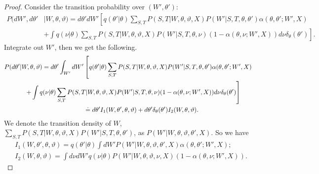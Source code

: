 \begin{proof}
Consider the transition probability over $(W',\theta')$:
\begin{align*}
  P(dW', d\theta'&| W, \theta, \vartheta)
=d\theta' dW' \left[q(\theta' | \theta)
  \sum_{S,T} P(S, T | W, \theta, \vartheta, X)P(W' | S, T, \theta, \theta')
\alpha(\theta, \theta' ; W', X)\right. \\
&\left.+ \int q(\nu | \theta) \sum_{S,T} P(S, T|W,\theta,\vartheta,
    X)P(W' | S, T, \theta, \nu) ( 1 - {\alpha(\theta, \nu ; W', X)})d\nu
    \delta_\theta(\theta')\right].
\end{align*}
Integrate out $W'$, then we get the following.
\begin{align*}
  P(d\theta'| W, \theta, \vartheta) =d\theta' \int_{W'}dW'&
  \left[q(\theta' | \theta)
    \sum_{S,T} P(S, T | W, \theta, \vartheta, X)P(W' | S, T, \theta,
  \theta')\alpha(\theta, \theta' ; W', X)\right.\\
  &\hspace{-1.3in}\left.  + \int q(\nu | \theta) \sum_{S,T} P(S, T |  W, \theta, \vartheta,
X)P(W' | S, T, \theta, \nu) ( 1 - \alpha(\theta, \nu ; W', X))d\nu
\delta_\theta(\theta')\right] \\
&\doteq d\theta' I_1(W, \theta', \theta, \vartheta) + d\theta'\delta_\theta(\theta')I_2(W, \theta, \vartheta).
\end{align*}
We denote the transition density of $W$, $\sum_{S,T} P(S, T | W, \theta, \vartheta, X)P(W' | S, T, \theta, \theta')$, as $P(W' | W, \theta, \vartheta, \theta', X)$. So we have
\begin{align*}
&I_1(W, \theta', \theta, \vartheta) = q(\theta' | \theta)\int dW'P(W' | W, \theta, \vartheta, \theta', X)\alpha(\theta, \theta' ; W', X); \\
&I_2(W, \theta, \vartheta) =\int d\nu  dW'q(\nu | \theta)P(W' | W, \theta, \vartheta, \nu, X)(1 - \alpha(\theta, \nu ; W', X)).
\end{align*}


\end{proof}
